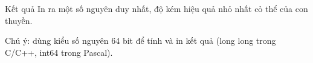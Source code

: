Kết quả  
In ra một số nguyên duy nhất, độ kém hiệu quả nhỏ nhất cỏ thể của con thuyền.  

   Chú ý: dùng kiểu số nguyên 64 bit để tính và in kết quả (long long trong C/C++, int64 trong Pascal).
